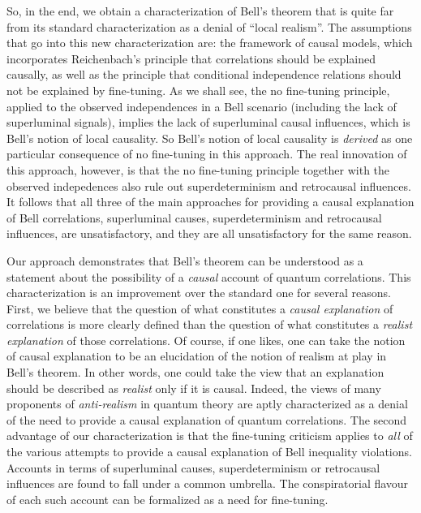 \documentclass[12pt,onecolumn,nofootinbib]{revtex4-2}
\begin{document}
So, in the end, we obtain a characterization of Bell's theorem that is quite far from its standard characterization as a denial of ``local realism''.  
The assumptions that go into this new characterization are: the framework of causal models, which incorporates Reichenbach's principle that correlations should be explained causally, as well as the principle that conditional independence relations should not be explained by fine-tuning.  As we shall see, the no fine-tuning principle, applied to the observed independences in a Bell scenario (including the lack of superluminal signals), implies the lack of superluminal causal influences, which is Bell's notion of local causality.  So Bell's notion of local causality is {\em derived} as one particular consequence of no fine-tuning in this approach.  The real innovation of this approach, however, is that the no fine-tuning principle together with the observed indepedences also rule out superdeterminism and retrocausal influences.   It follows that all three of the main approaches for providing a causal explanation of Bell correlations, superluminal causes, superdeterminism and retrocausal influences, are unsatisfactory, and they are all unsatisfactory for the same reason. 

Our approach demonstrates that Bell's theorem can be understood as a statement about the possibility of a {\em causal} account of quantum correlations. This characterization is an improvement over the standard one for several reasons.   First, we believe that the question of what constitutes a {\em causal explanation} of correlations is more clearly defined than the question of what constitutes a {\em realist explanation} of those correlations.  Of course, if one likes,  one can take the notion of causal explanation to be an elucidation of the notion of realism at play in Bell's theorem.  In other words, one could take the view that an explanation should be described as {\em realist} only if it is causal. Indeed, the views of many proponents of {\em anti-realism} in quantum theory are aptly characterized as a denial of the need to provide a causal explanation of quantum correlations.  The second advantage of our characterization is that the fine-tuning criticism applies to {\em all} of the various attempts to provide a causal explanation of Bell inequality violations.  Accounts in terms of superluminal causes, superdeterminism or retrocausal influences are found to fall under a common umbrella.  The conspiratorial flavour of each such account can be formalized as a need for fine-tuning. 
\end{document}

